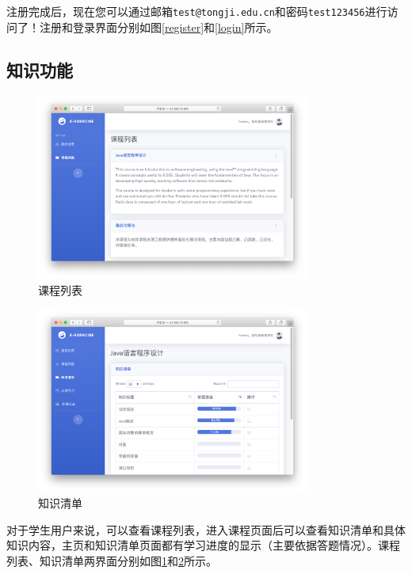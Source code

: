 \documentclass{nwafucoursepaper}
\begin{document}
注册完成后，现在您可以通过邮箱\verb|test@tongji.edu.cn|和密码\verb|test123456|进行访问了！注册和登录界面分别如图\ref{register}和\ref{login}所示。

\subsection{知识功能}

\begin{figure}[htp]
  \centering
  \includegraphics[width=0.8\textwidth]{subject_list.png}
  \caption{课程列表}
  \label{subject_list}
\end{figure}

\begin{figure}[htp]
  \centering
  \includegraphics[width=0.8\textwidth]{knowledge_list.png}
  \caption{知识清单}
  \label{knowledge_list}
\end{figure}

对于学生用户来说，可以查看课程列表，进入课程页面后可以查看知识清单和具体知识内容，主页和知识清单页面都有学习进度的显示（主要依据答题情况）。课程列表、知识清单两界面分别如图\ref{subject_list}和\ref{knowledge_list}所示。
\end{document}
